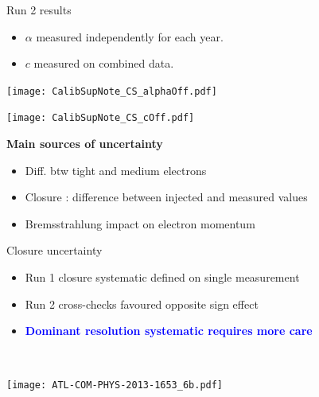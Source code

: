 \begin{frame}{Run 2 results}
  \begin{itemize}
  \item $\alpha$ measured independently for each year.
  \item $c$ measured on combined data.
    \end{itemize}

  \begin{minipage}{0.49\linewidth} 
    \texttt{[image: CalibSupNote\_CS\_alphaOff.pdf]}
  \end{minipage}
  \hfill
  \begin{minipage}{0.49\linewidth}
    \texttt{[image: CalibSupNote\_CS\_cOff.pdf]}
  \end{minipage}

    \begin{center}
    \begin{minipage}{0.7\linewidth}
      \centering
      {\bf Main sources of uncertainty }
      \begin{itemize}
      \item Diff. btw tight and medium electrons
      \item Closure : difference between injected and measured values
      \item Bremsstrahlung impact on electron momentum
      \end{itemize}
    \end{minipage}
  \end{center}

\end{frame}
\begin{frame}{Closure uncertainty}
  \centering
  \begin{minipage}{0.9\linewidth}
    \begin{itemize}
    \item Run 1 closure systematic defined on single measurement
    \item Run 2 cross-checks favoured opposite sign effect
    \item \textcolor{blue}{\bf Dominant resolution systematic requires more care}
    \end{itemize}
  \end{minipage}
  \\
  \begin{minipage}{0.49\linewidth}
    \texttt{[image: ATL-COM-PHYS-2013-1653\_6b.pdf]}
  \end{minipage}
\end{frame}
